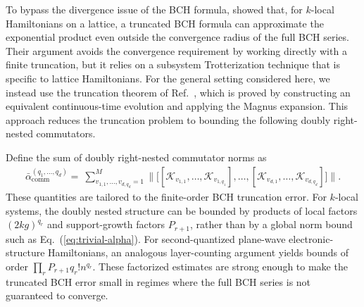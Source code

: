 \documentclass[aps,pra,reprint,groupedaddress,floatfix]{revtex4-2}
\newcommand{\eq}[1]{(\ref{eq:#1})}
\renewcommand{\comm}{\mathrm{comm}}
\newcommand{\mc}{\mathcal}
\newcommand{\xz}[1]{{\color{cyan} XZ: #1}}
\newcommand{\sz}[1]{{\color{blue} Shuo: #1}}
\begin{document}
To bypass the divergence issue of the BCH formula, \citet{mizuta2025commutator} showed that, for $k$-local Hamiltonians on a lattice, a truncated BCH formula can approximate the exponential product even outside the convergence radius of the full BCH series. Their argument avoids the convergence requirement by working directly with a finite truncation, but it relies on a subsystem Trotterization technique that is specific to lattice Hamiltonians. For the general setting considered here, we instead use the truncation theorem of Ref.~\cite{wang2026lindbladiansimulationcommutatorbounds}, which is proved by constructing an equivalent continuous-time evolution and applying the Magnus expansion. This approach reduces the truncation problem to bounding the following doubly right-nested commutators.

Define the sum of doubly right-nested commutator norms as
\begin{align}
\label{eq:def-beta-bar-general}
    \bar{\alpha}_{\comm}^{(q_1, \ldots, q_{d})}
    =~ 
    \sum_{v_{1,1}, \ldots, v_{d, q_{d}} = 1}^M \bigg\| \Big[ 
         [\mc K_{v_{1,1}}, \ldots, \mc K_{v_{1,q_1}}], \ldots, 
        [\mc K_{v_{d,1}}, \ldots, \mc K_{v_{d,q_{d}}}]
     \Big] \bigg\|.
\end{align}
These quantities are tailored to the finite-order BCH truncation error. For $k$-local systems, the doubly nested structure can be bounded by products of local factors $(2kg)^{q_r}$ and support-growth factors $P_{r+1}$, rather than by a global norm bound such as Eq.~\eq{trivial-alpha}. For second-quantized plane-wave electronic-structure Hamiltonians, an analogous layer-counting argument yields bounds of order $\prod_r P_{r+1}q_r!n^{q_r}$. These factorized estimates are strong enough to make the truncated BCH error small in regimes where the full BCH series is not guaranteed to converge.
\end{document}
